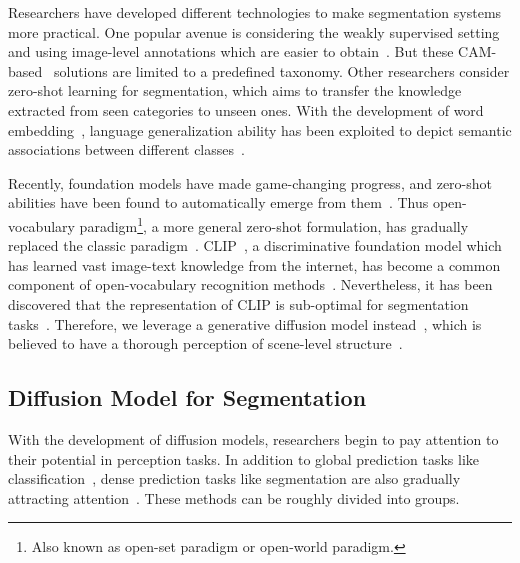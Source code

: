 \documentclass[letterpaper]{article} \usepackage[submission]{aaai24}  \usepackage{times}  \usepackage{helvet}  \usepackage{courier}  \usepackage[hyphens]{url}  \usepackage{graphicx} \urlstyle{rm} \def\UrlFont{\rm}  \usepackage{natbib}  \usepackage{caption} \frenchspacing  \setlength{\pdfpagewidth}{8.5in} \setlength{\pdfpageheight}{11in} \usepackage{algorithm}
\begin{document}
Researchers have developed different technologies to make segmentation systems more practical.
One popular avenue is considering the weakly supervised setting and using image-level annotations which are easier to obtain~\cite{affinitynet, clims}.
But these CAM-based~\cite{cam} solutions are limited to a predefined taxonomy.
Other researchers consider zero-shot learning for segmentation, which aims to transfer the knowledge extracted from seen categories to unseen ones.
With the development of word embedding~\cite{word2vec, glove}, language generalization ability has been exploited to depict semantic associations between different classes~\cite{openparse, zs3}.

Recently, foundation models have made game-changing progress, and zero-shot abilities have been found to automatically emerge from them~\cite{gpt3, instructgpt, clip}.
Thus open-vocabulary paradigm\footnote{Also known as open-set paradigm or open-world paradigm.}, a more general zero-shot formulation, has gradually replaced the classic paradigm~\cite{ovd, UVO}.
CLIP~\cite{clip}, a discriminative foundation model which has learned vast image-text knowledge from the internet, has become a common component of open-vocabulary recognition methods~\cite{vild, openseg, lseg, denseclip}.
Nevertheless, it has been discovered that the representation of CLIP is sub-optimal for segmentation tasks~\cite{ODISE}.
Therefore, we leverage a generative diffusion model instead~\cite{stablediffusion}, which is believed to have a thorough perception of scene-level structure~\cite{ODISE, daam}.


\subsection{Diffusion Model for Segmentation}
\label{sec:diffseg}

With the development of diffusion models, researchers begin to pay attention to their potential in perception tasks.
In addition to global prediction tasks like classification~\cite{diffusionclass}, dense prediction tasks like segmentation are also gradually attracting attention~\cite{diffusionimplicitseg, ddpmseg, VPD, grounddiff, diffumask}.
These methods can be roughly divided into  groups.
\end{document}

